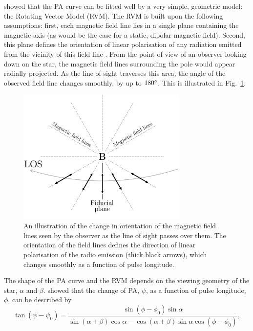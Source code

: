 \citet{RCxx1969} showed that the PA curve can be fitted well by a very simple, geometric model: the Rotating Vector Model (RVM). The RVM is built upon the following assumptions: first, each magnetic field line lies in a single plane containing the magnetic axis (as would be the case for a static, dipolar magnetic field). Second, this plane defines the orientation of linear polarisation of any radiation emitted from the vicinity of this field line \citep[e.g.][]{Cxxx2015}. From the point of view of an observer looking down on the star, the magnetic field lines surrounding the pole would appear radially projected. As the line of sight traverses this area, the angle of the observed field line changes smoothly, by up to $180^\circ$. This is illustrated in Fig.~\ref{fig: intro - RVM field line schematic}.
\begin{figure}
    \begin{center}
        \includegraphics[width=0.75\textwidth]{Figures/Introduction/PA_curve_illustration}
        \caption[The Rotating Vector Model]{An illustration of the change in orientation of the magnetic field lines seen by the observer as the line of sight passes over them. The orientation of the field lines defines the direction of linear polarisation of the radio emission (thick black arrows), which changes smoothly as a function of pulse longitude.}
        \label{fig: intro - RVM field line schematic}
    \end{center}
\end{figure}
The shape of the PA curve and the RVM depends on the viewing geometry of the star, $\alpha$ and $\beta$. \citet{Kxxx1970} showed that the change of PA, $\psi$, as a function of pulse longitude, $\phi$, can be described by 
\begin{equation}
    \label{eq: intro - RVM}
        \tan(\psi - \psi_0) = \frac{\sin(\phi-\phi_0)\sin\alpha}{\sin(\alpha+\beta)\cos\alpha-\cos(\alpha+\beta)\sin\alpha\cos(\phi-\phi_0)},
\end{equation}
